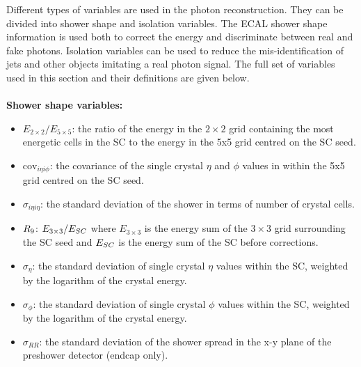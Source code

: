 Different types of variables are used in the photon reconstruction.
They can be divided into shower shape and isolation variables.
The ECAL shower shape information is used both to correct the energy and discriminate between real and fake photons.
Isolation variables can be used to reduce the mis-identification of jets and other objects imitating a real photon signal.
The full set of variables used in this section and their definitions are given below.
\\ \\
\textbf{Shower shape variables:}
\begin{itemize}[noitemsep]
  \item \emph{$E_{2\times2}/E_{5\times5}$}: the ratio of the energy in the $2\times2$ grid
    containing the most energetic cells in the SC to the energy in
    the 5x5 grid centred on the SC seed.
  \item \emph{$\textrm{cov}_{i\eta i\phi}$}: the covariance of the single crystal $\eta$
    and $\phi$ values in within the 5x5 grid centred on the
    SC seed.
  \item \emph{$\sigma_{i\eta i\eta}$}: the standard deviation of the 
    shower in terms of number of crystal cells. 
  \item \emph{$R_9$}: $E_{3\times3}/E_{SC}$ where $E_{3\times3}$ is the energy sum of the
    $3\times3$ grid surrounding the SC seed and $E_{SC}$ is the energy sum of the SC before corrections. 
  \item \emph{$\sigma_{\eta}$}: the standard deviation
    of single crystal $\eta$ values within the SC, weighted by the logarithm of the crystal energy.
  \item \emph{$\sigma_{\phi}$}: the standard deviation
    of single crystal $\phi$ values within the SC, weighted by the logarithm of the crystal energy.
  \item \emph{$\sigma_{RR}$}: the standard deviation of the shower
    spread in the x-y plane of the preshower detector (endcap only).
\end{itemize}

